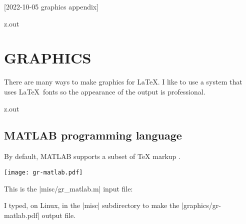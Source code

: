 [2022-10-05 graphics appendix]

\begin{VerbatimOut}{z.out}
\chapter{GRAPHICS}

There are many ways to make graphics for \LaTeX.
I like to use a system that uses \LaTeX\ fonts
so the appearance of the output is professional.
\end{VerbatimOut}

\MyIO


\begin{VerbatimOut}{z.out}

\section{MATLAB programming language}

\def\gray#1{\colorbox{gray!15}{#1}}
\def\lightred#1{\colorbox{red!15}{#1}}
\def\lightgreen#1{\colorbox{green!20}{#1}}
\lightgreen{%
  By default,
  MATLAB supports a subset of TeX markup
  \cite{mathworks-help-center-text-properties}.
}

\texttt{[image: gr-matlab.pdf]}

This is the |misc/gr_matlab.m| input file:

I typed, on Linux,
in the |misc| subdirectory
to make the |graphics/gr-matlab.pdf| output file.
\end{VerbatimOut}

\MyIO


